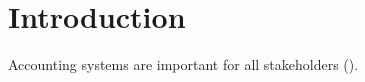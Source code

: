 \section{Introduction} \label{sec:Introduction}

Accounting systems are important for all stakeholders
(\cite[][]{Boczko:2012:IAI:2331376}).
